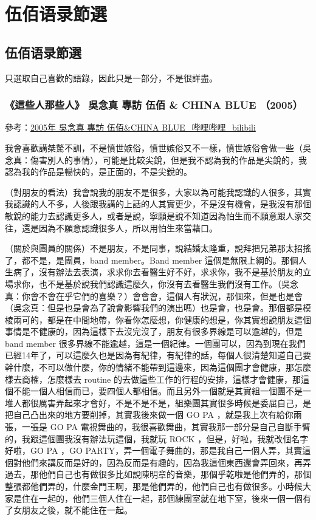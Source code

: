 \documentclass[UTF8,a4paper,oneside,twocolumn,12pt]{ctexbook}
\begin{document}
\onecolumn
\part{伍佰语录節選}
\chapter{伍佰语录節選}
只選取自己喜歡的語錄，因此只是一部分，不是很詳盡。

\section{《這些人那些人》 吳念真 專訪 伍佰 \& CHINA BLUE （2005）}
參考：\href{https://www.bilibili.com/video/BV1Jx411X79n}{2005年 吳念真 專訪 伍佰\&CHINA BLUE\_哔哩哔哩\_bilibili}

我會喜歡講桀驁不訓，不是憤世嫉俗，憤世嫉俗又不一樣，憤世嫉俗會做一些（吳念真：傷害別人的事情），可能是比較尖銳，但是我不認為我的作品是尖銳的，我認為我的作品是暢快的，是正面的，不是尖銳的。

（對朋友的看法）我會說我的朋友不是很多，大家以為可能我認識的人很多，其實我認識的人不多，人後跟我講的上話的人其實更少，不是沒有機會，是我沒有那個敏銳的能力去認識更多人，或者是說，寧願是說不知道因為怕生而不願意跟人家交往，還是因為不願意認識很多人，所以用怕生來當藉口。

（關於與團員的關係）不是朋友，不是同事，說結婚太隆重，說拜把兄弟那太招搖了，都不是，是團員，band member。Band member 這個是無限上綱的。那個人生病了，沒有辦法去表演，求求你去看醫生好不好，求求你，我不是基於朋友的立場求你，也不是基於說我們認識這麼久，你沒有去看醫生我們沒有工作。（吳念真：你會不會在乎它們的喜樂？）會會會，這個人有狀況，那個來，但是也是會（吳念真：但是也是會為了說會影響我們的演出嗎）也是會，也是會。那個都是模棱兩可的，都是在中間地帶，你看你怎麼想，你健康的想是，你其實想說朋友這個事情是不健康的，因為這樣下去沒完沒了，朋友有很多界線是可以逾越的，但是 band member 很多界線不能逾越，這是一個紀律。一個團可以，因為到現在我們已經14年了，可以這麼久也是因為有紀律，有紀律的話，每個人很清楚知道自己要幹什麼，不可以做什麼，你的情緒不能帶到這邊來，因為這個團才會健康，那怎麼樣去商榷，怎麼樣去 routine 的去做這些工作的行程的安排，這樣才會健康，那這個不能一個人相信而已，要四個人都相信。而且另外一個就是其實組一個團不是一堆人都很厲害弄起來才會好，不是不是不是，組樂團其實很多時候是委屈自己，是把自己凸出來的地方要削掉，其實我後來做一個 GO PA ，就是我上次有給你兩張，一張是 GO PA 電視舞曲的，我很喜歡舞曲，其實我那一部分是自己自斷手臂的，我跟這個團我沒有辦法玩這個，我就玩 ROCK ，但是，好啦，我就改個名字好啦，GO PA ，GO PARTY，弄一個電子舞曲的，那是我自己一個人弄，其實這個對他們來講反而是好的，因為反而是有趣的，因為我這個東西還會弄回來，再弄過去，那他們自己也有做很多比如說陳明章的音樂，那個乎乾啦是他們弄的，那個整張都他們弄的，什麼金門王啊，那是他們弄的，他們自己也有做很多。小時候大家是住在一起的，他們三個人住在一起，那個練團室就在地下室，後來一個一個有了女朋友之後，就不能住在一起。
\end{document}
